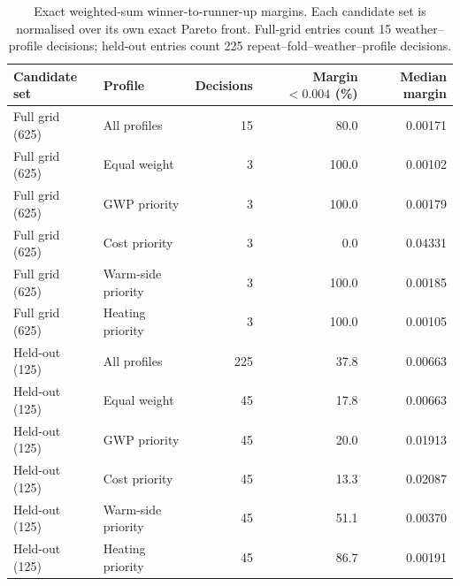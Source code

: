 \begin{table}[htbp]
\centering
\small
\caption{Exact weighted-sum winner-to-runner-up margins. Each candidate set is normalised over its own exact Pareto front. Full-grid entries count 15 weather--profile decisions; held-out entries count 225 repeat--fold--weather--profile decisions.}
\label{tab:s1-candidate-margins}
\setlength{\tabcolsep}{4pt}
\begin{tabular}{llrrr}
\toprule
Candidate set & Profile & Decisions & Margin $<0.004$ (\%) & Median margin \\
\midrule
Full grid (625) & All profiles & 15 & 80.0 & 0.00171 \\
Full grid (625) & Equal weight & 3 & 100.0 & 0.00102 \\
Full grid (625) & GWP priority & 3 & 100.0 & 0.00179 \\
Full grid (625) & Cost priority & 3 & 0.0 & 0.04331 \\
Full grid (625) & Warm-side priority & 3 & 100.0 & 0.00185 \\
Full grid (625) & Heating priority & 3 & 100.0 & 0.00105 \\
Held-out (125) & All profiles & 225 & 37.8 & 0.00663 \\
Held-out (125) & Equal weight & 45 & 17.8 & 0.00663 \\
Held-out (125) & GWP priority & 45 & 20.0 & 0.01913 \\
Held-out (125) & Cost priority & 45 & 13.3 & 0.02087 \\
Held-out (125) & Warm-side priority & 45 & 51.1 & 0.00370 \\
Held-out (125) & Heating priority & 45 & 86.7 & 0.00191 \\
\bottomrule
\end{tabular}
\end{table}

